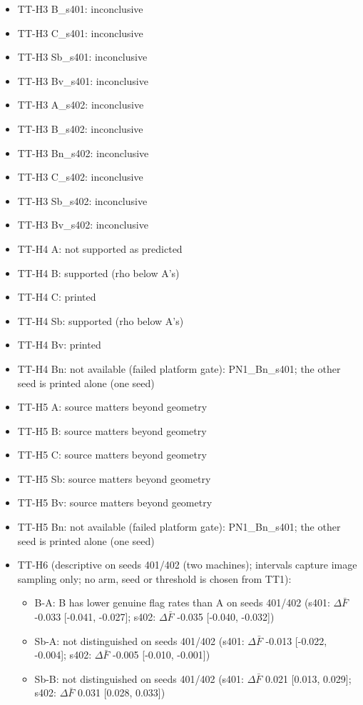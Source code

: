 \documentclass[10pt,twocolumn,letterpaper]{article}
\providecommand{\tightlist}{\setlength{\itemsep}{0pt}\setlength{\parskip}{0pt}}
\begin{document}
\begin{itemize}
\item
  TT-H3 B\_s401: inconclusive
\item
  TT-H3 C\_s401: inconclusive
\item
  TT-H3 Sb\_s401: inconclusive
\item
  TT-H3 Bv\_s401: inconclusive
\item
  TT-H3 A\_s402: inconclusive
\item
  TT-H3 B\_s402: inconclusive
\item
  TT-H3 Bn\_s402: inconclusive
\item
  TT-H3 C\_s402: inconclusive
\item
  TT-H3 Sb\_s402: inconclusive
\item
  TT-H3 Bv\_s402: inconclusive
\item
  TT-H4 A: not supported as predicted
\item
  TT-H4 B: supported (\textbar rho\textbar{} below A's)
\item
  TT-H4 C: printed
\item
  TT-H4 Sb: supported (\textbar rho\textbar{} below A's)
\item
  TT-H4 Bv: printed
\item
  TT-H4 Bn: not available (failed platform gate): PN1\_Bn\_s401; the other seed is printed alone (one seed)
\item
  TT-H5 A: source matters beyond geometry
\item
  TT-H5 B: source matters beyond geometry
\item
  TT-H5 C: source matters beyond geometry
\item
  TT-H5 Sb: source matters beyond geometry
\item
  TT-H5 Bv: source matters beyond geometry
\item
  TT-H5 Bn: not available (failed platform gate): PN1\_Bn\_s401; the other seed is printed alone (one seed)
\item
  TT-H6 (descriptive on seeds 401/402 (two machines); intervals capture image sampling only; no arm, seed or threshold is chosen from TT1):

  \begin{itemize}
  \tightlist
  \item
    B-A: B has lower genuine flag rates than A on seeds 401/402 (s401: \(\Delta\)\(\bar F\) -0.033 {[}-0.041, -0.027{]}; s402: \(\Delta\)\(\bar F\) -0.035 {[}-0.040, -0.032{]})
  \item
    Sb-A: not distinguished on seeds 401/402 (s401: \(\Delta\)\(\bar F\) -0.013 {[}-0.022, -0.004{]}; s402: \(\Delta\)\(\bar F\) -0.005 {[}-0.010, -0.001{]})
  \item
    Sb-B: not distinguished on seeds 401/402 (s401: \(\Delta\)\(\bar F\) 0.021 {[}0.013, 0.029{]}; s402: \(\Delta\)\(\bar F\) 0.031 {[}0.028, 0.033{]})
  \end{itemize}
\end{itemize}
\clearpage
\clearpage
\end{document}

